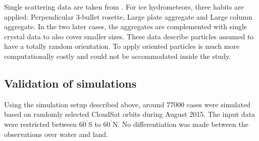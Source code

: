 \documentclass[12pt]{article}
\newcommand{\degree}{\ensuremath{\mathrm{^\circ}}}
\begin{document}
Single scattering data are taken from \citet{eriksson:agene:18}. For ice
hydrometeors, three habits are applied: Perpendicular 3-bullet rosette, Large
plate aggregate and Large column aggregate. In the two later cases, the
aggregates are complemented with single crystal data to also cover smaller
sizes. These data describe particles assumed to have a totally random
orientation. To apply oriented particles is much more computationally costly
and could not be accommodated inside the study.


\subsection{Validation of simulations}
\label{sec:validation}
%
Using the simulation setup described above, around 77000 cases were simulated
based on randomly selected CloudSat orbits during August 2015. The input data
were restricted between $60^{\degree}$S to $60^{\degree}$N. No differentiation
was made between the observations over water and land. 
\end{document}

